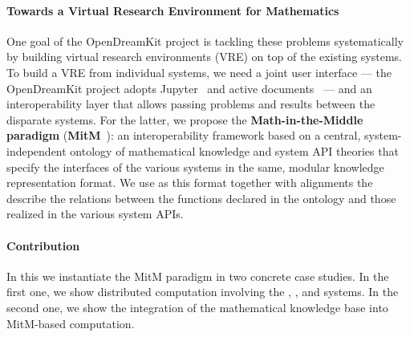 \paragraph{Towards a Virtual Research Environment for Mathematics}
One goal of the OpenDreamKit project is tackling these problems systematically by building virtual research environments (VRE) on top of the existing systems.
To build a VRE from individual systems, we need a joint user interface --- the OpenDreamKit project adopts Jupyter~\cite{jupyter-project:on} and active documents~\cite{KohDavGin:psewads11} --- and an interoperability layer that allows passing problems and results between the disparate systems.
For the latter, we propose the \textbf{Math-in-the-Middle paradigm} (\textbf{MitM}~\cite{DehKohKon:iop16}): an interoperability framework based on a central, system-independent ontology of mathematical knowledge and system API theories that specify the interfaces of the various systems in the same, modular knowledge representation format.
We use \ommt as this format together with alignments the describe the relations between the functions declared in the ontology and those realized in the various system APIs.

\paragraph{Contribution}
In this \papertype we instantiate the MitM paradigm in two concrete case studies.
In the first one, we show distributed computation involving the \GAP, \Sage, and \Singular systems.
In the second one, we show the integration of the mathematical knowledge base \LMFDB into MitM-based computation.

